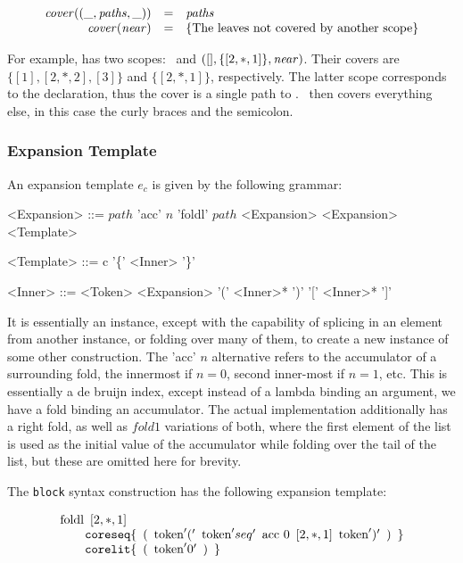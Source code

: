 \documentclass{kththesis}
\begin{document}
$$
\begin{array}{rcl}
\mathit{cover}(\text{(}\_, \mathit{paths}, \_\text{)}) & = & \mathit{paths} \\
\mathit{cover}(\mathit{near}) & = & \{\text{The leaves not covered by another scope}\} \\
\end{array}
$$

For example,  has two scopes: \near\ and $([], \{[2, *, 1]\}, \mathit{near})$. Their covers are $\{[1], [2, *, 2], [3]\}$ and $\{[2, *, 1]\}$, respectively. The latter scope corresponds to the  declaration, thus the cover is a single path to . \near\ then covers everything else, in this case the curly braces and the semicolon.

\subsubsection{Expansion Template}

An expansion template $e_c$ is given by the following grammar:

\setlength{\grammarindent}{8em}
\begin{grammar}
<Expansion> ::= $path$
  \alt 'acc' $n$
  \alt 'foldl' $path$ <Expansion> <Expansion>
  \alt <Template>

<Template> ::= c '\{' <Inner> '\}'

<Inner> ::= <Token>
  \alt <Expansion>
  \alt '(' <Inner>* ')'
  \alt '[' <Inner>* ']'
\end{grammar}

It is essentially an instance, except with the capability of splicing in an element from another instance, or folding over many of them, to create a new instance of some other construction. The 'acc' $n$ alternative refers to the accumulator of a surrounding fold, the innermost if $n = 0$, second inner-most if $n = 1$, etc. This is essentially a de bruijn index, except instead of a lambda binding an argument, we have a fold binding an accumulator. The actual implementation additionally has a right fold, as well as $fold1$ variations of both, where the first element of the list is used as the initial value of the accumulator while folding over the tail of the list, but these are omitted here for brevity.

The \texttt{block} syntax construction has the following expansion template:

$$
\begin{array}{l}
\text{foldl} \enspace [2, *, 1] \\
\qquad \text{\texttt{coreseq}}\{ \enspace \text{(} \enspace \text{token}'(' \enspace \text{token}'seq' \enspace \text{acc}~0 \enspace [2, *, 1] \enspace \text{token}')' \enspace \text{)} \enspace \} \\
\qquad \text{\texttt{corelit}}\{ \enspace \text{(} \enspace \text{token}'0' \enspace \text{)} \enspace \}
\end{array}
$$
\end{document}
